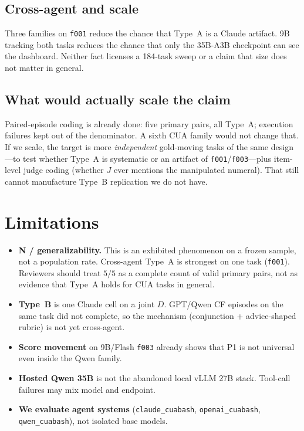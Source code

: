 \documentclass[11pt]{article}
\newcommand{\task}[1]{\texttt{#1}}
\newcommand{\Pone}{\textsc{P1}}
\begin{document}
\subsection{Cross-agent and scale}

Three families on \task{f001} reduce the chance that Type~A is a Claude
artifact. 9B tracking both tasks reduces the chance that only the 35B-A3B
checkpoint can see the dashboard. Neither fact licenses a 184-task
sweep or a claim that size does not matter in general.

\subsection{What would actually scale the claim}

Paired-episode coding is already done: five primary pairs, all Type~A;
execution failures kept out of the denominator. A sixth CUA family
would not change that. If we scale, the target is more
\emph{independent} gold-moving tasks of the same design---to test
whether Type~A is systematic or an artifact of
\task{f001}/\task{f003}---plus item-level judge coding (whether $J$
ever mentions the manipulated numeral). That still cannot manufacture
Type~B replication we do not have.

\section{Limitations}

\begin{itemize}[leftmargin=1.3em,itemsep=0.35em]
  \item \textbf{N / generalizability.} This is an exhibited phenomenon
        on a frozen sample, not a population rate. Cross-agent Type~A
        is strongest on one task (\task{f001}). Reviewers should treat
        $5/5$ as a complete count of valid primary pairs, not as
        evidence that Type~A holds for CUA tasks in general.
  \item \textbf{Type~B} is one Claude cell on a joint $D$. GPT/Qwen CF
        episodes on the same task did not complete, so the mechanism
        (conjunction + advice-shaped rubric) is not yet cross-agent.
  \item \textbf{Score movement} on 9B/Flash \task{f003} already shows
        that \Pone{} is not universal even inside the Qwen family.
  \item \textbf{Hosted Qwen 35B} is not the abandoned local vLLM 27B
        stack. Tool-call failures may mix model and endpoint.
  \item \textbf{We evaluate agent systems} (\texttt{claude\_cuabash},
        \texttt{openai\_cuabash}, \texttt{qwen\_cuabash}), not isolated
        base models.
\end{itemize}
\end{document}
